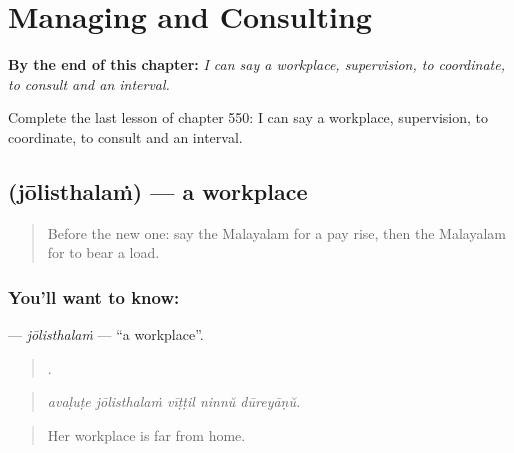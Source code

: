 
\chapter{Managing and Consulting}
\label{ch:ml-managing-and-consulting}

\begin{chapteropening}
\textbf{By the end of this chapter:} \emph{I can say a workplace, supervision, to coordinate, to consult and an interval.}

Complete the last lesson of chapter 550: I can say a workplace, supervision, to coordinate, to consult and an interval.
\end{chapteropening}

\section[\texorpdfstring{\ml{ജോലിസ്ഥലം} (jōlisthalaṁ)}{ജോലിസ്ഥലം (jōlisthalaṁ)}]{ (jōlisthalaṁ) — a workplace}

\label{lesson:ML-C550-jolisthalam}



\begin{quote}
Before the new one: say the Malayalam for a pay rise, then the Malayalam for to bear a load.
\end{quote}

\subsection*{You'll want to know: }
\textbf{} — \emph{jōlisthalaṁ} — \textquotedblleft{}a workplace\textquotedblright{}.

\begin{quote}
    .
\end{quote}

\begin{quote}
\emph{avaḷuṭe jōlisthalaṁ vīṭṭil ninnŭ dūreyāṇŭ.}
\end{quote}

\begin{quote}
Her workplace is far from home.
\end{quote}


